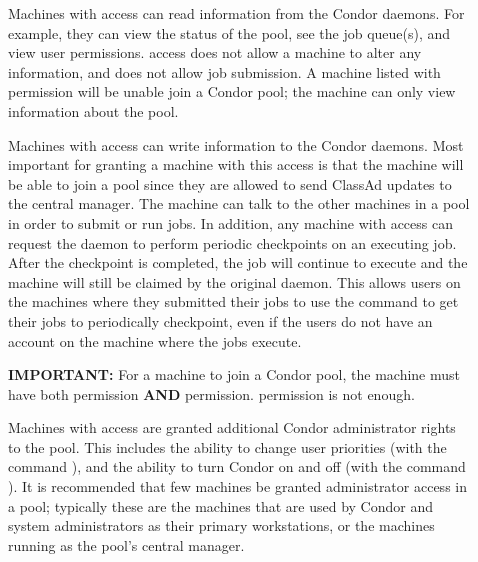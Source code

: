 \begin{description}

\item[] \label{dcperm:read} Machines with 
   access can read information from the Condor daemons.  For example, they can
   view the status of the pool, see the job queue(s), and view user
   permissions.   access does not allow a machine to
   alter any information, and does not allow
   job submission. A machine listed
   with  permission will be unable join a Condor pool; the machine can
   only view information about the pool.

\item[] \label{dcperm:write} Machines with
    access can write information to the Condor daemons.
   Most important for granting a machine with this access is that the machine
   will be able to join a pool since they are allowed to send ClassAd
   updates to the central manager.
   The machine can talk to the other machines
   in a pool in order to submit or run jobs.
   In addition, any machine with
    access can request the  daemon to perform
   periodic checkpoints on an executing job. After the
   checkpoint is completed, the job will continue to execute and the
   machine will still be claimed by the original  daemon.
   This allows users on the machines where they submitted their jobs
   to use the  command to get their jobs to
   periodically checkpoint, even if the users do not have an account on the
   machine where the jobs execute.

   \textbf{IMPORTANT:} For a machine to join a Condor pool, the machine must
   have both  permission \textbf{AND}  permission.
    permission is not enough.

\item[] \label{dcperm:administrator} Machines
   with  access are granted additional Condor
   administrator rights to the pool.  This includes the ability to
   change user priorities (with the command ),
   and the ability to turn Condor on and off
   (with the command ).
   It is recommended that few machines be granted administrator access in a pool;
   typically these are the machines that are used by Condor and system
   administrators as their primary workstations,
   or the machines running as the pool's central manager.


\end{description}
